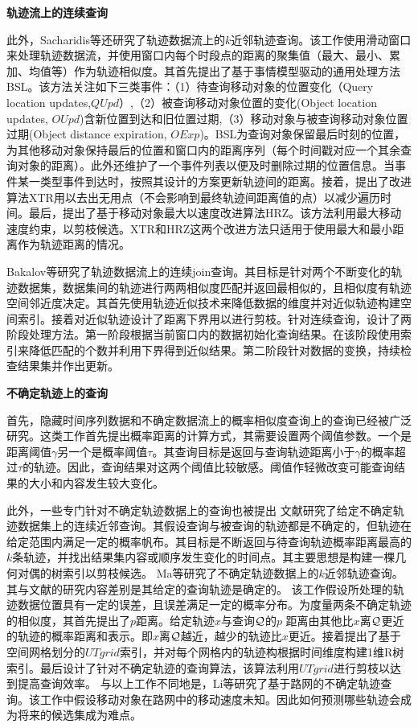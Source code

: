 \textbf{轨迹流上的连续查询}

此外，Sacharidis等\cite{SacharidisSS14}还研究了轨迹数据流上的$k$近邻轨迹查询。该工作使用滑动窗口来处理轨迹数据流，并使用窗口内每个时段点的距离的聚集值（最大、最小、累加、均值等）作为轨迹相似度。其首先提出了基于事情模型驱动的通用处理方法BSL。该方法关注如下三类事件：（1）待查询移动对象的位置变化（Query location updates,$QUpd$）,（2）被查询移动对象位置的变化(Object location updates, $OUpd$)含新位置到达和旧位置过期,（3）移动对象与被查询移动对象位置过期(Object distance expiration, $OExp$)。BSL为查询对象保留最后时刻的位置，为其他移动对象保持最后的位置和窗口内的距离序列（每个时间戳对应一个其余查询对象的距离）。此外还维护了一个事件列表以便及时删除过期的位置信息。当事件某一类型事件到达时，按照其设计的方案更新轨迹间的距离。接着，提出了改进算法XTR用以去出无用点（不会影响到最终轨迹间距离值的点）以减少遍历时间。最后，提出了基于移动对象最大以速度改进算法HRZ。该方法利用最大移动速度约束，以剪枝候选。XTR和HRZ这两个改进方法只适用于使用最大和最小距离作为轨迹距离的情况。

Bakalov等\cite{BakalovT06}研究了轨迹数据流上的连续join查询。其目标是针对两个不断变化的轨迹数据集，数据集间的轨迹进行两两相似度匹配并返回最相似的，且相似度有轨迹空间邻近度决定。其首先使用轨迹近似技术来降低数据的维度并对近似轨迹构建空间索引。接着对近似轨迹设计了距离下界用以进行剪枝。针对连续查询，设计了两阶段处理方法。第一阶段根据当前窗口内的数据初始化查询结果。在该阶段使用索引来降低匹配的个数并利用下界得到近似结果。第二阶段针对数据的变换，持续检查结果集并作出更新。

\textbf{不确定轨迹上的查询}

首先，隐藏时间序列数据和不确定数据流上的概率相似度查询\cite{LianCY08,YehWYC09}上的查询已经被广泛研究。这类工作首先提出概率距离的计算方式，其需要设置两个阈值参数。一个是距离阈值$\gamma$另一个是概率阈值$\tau$。其查询目标是返回与查询轨迹距离小于$\gamma$的概率超过$\tau$的轨迹。因此，查询结果对这两个阈值比较敏感。阈值作轻微改变可能查询结果的大小和内容发生较大变化。

此外，一些专门针对不确定轨迹数据上的查询也被提出\cite{TrajcevskiTDSC09,Ma2013KSQ}
文献\cite{TrajcevskiTDSC09,Trajcevski2011}研究了给定不确定轨迹数据集上的连续近邻查询。其假设查询与被查询的轨迹都是不确定的，但轨迹在给定范围内满足一定的概率帆布。其目标是不断返回与待查询轨迹概率距离最高的$k$条轨迹，并找出结果集内容或顺序发生变化的时间点。其主要思想是构建一棵几何对偶的树索引以剪枝候选。
Ma等\cite{Ma2013KSQ}研究了不确定轨迹数据上的$k$近邻轨迹查询。其与文献\cite{TrajcevskiTDSC09}的研究内容差别是其给定的查询轨迹是确定的。
该工作假设所处理的轨迹数据位置具有一定的误差，且误差满足一定的概率分布。为度量两条不确定轨迹的相似度，其首先提出了$p$距离。给定轨迹$x$与查询$\cal Q$的$p$ 距离由其他比$x$离$\cal Q$更近的轨迹的概率距离和表示。即$x$离$\cal Q$越近，越少的轨迹比$x$更近。接着提出了基于空间网格划分的$UTgrid$索引，并对每个网格内的轨迹构根据时间维度构建1维R树索引。最后设计了针对不确定轨迹的查询算法，该算法利用$UTgrid$进行剪枝以达到提高查询效率。
与以上工作不同地是，Li等\cite{LiLSF11}研究了基于路网的不确定轨迹查询。该工作中假设移动对象在路网中的移动速度未知。因此如何预测哪些轨迹会成为将来的候选集成为难点。

